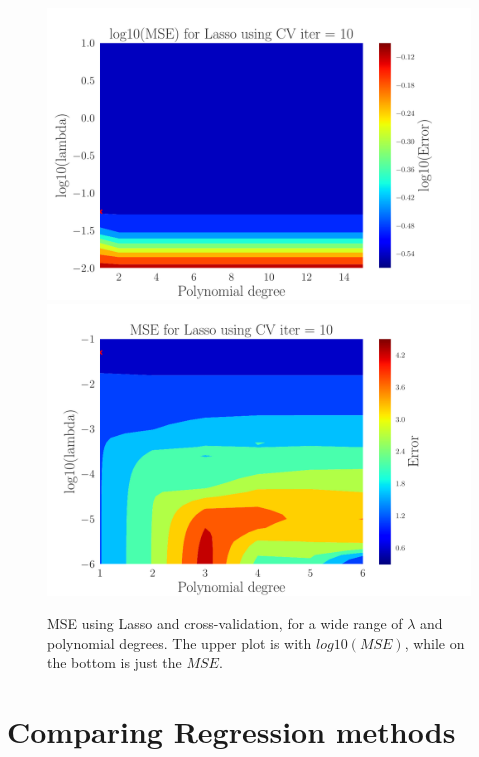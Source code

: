 \documentclass[reprint,english,notitlepage,aps,nobalancelastpage,nofootinbib]{revtex4-1}  %
\begin{document}
\begin{figure}[h]
	\includegraphics[width=\linewidth]{Contour_PL_Lasso_CV10_n30_eps0.2_p1_15_lmb1_m2.pdf}
	\endminipage\hfill
	\includegraphics[width=\linewidth]{Contour_PL_Lasso_CV10_n30_eps0.2_p1_6_lmbm1_m6.pdf}
	\endminipage
	\caption{MSE using Lasso and cross-validation, for a wide range of $\lambda$ and polynomial degrees. The upper plot is with $log10(MSE)$, while on the bottom is just the $MSE$.}
	\label{fig:Lasso_CV_heatmaps}
\end{figure}




\section*{Comparing Regression methods}
\end{document}
